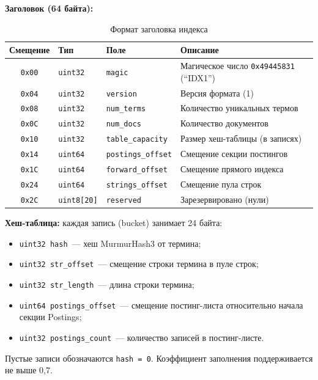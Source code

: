 \documentclass[a4paper,12pt]{article}
\begin{document}
\textbf{Заголовок (64 байта):}

\begin{table}[H]
\centering
\caption{Формат заголовка индекса}
\begin{tabular}{cllp{6cm}}
\toprule
\textbf{Смещение} & \textbf{Тип} & \textbf{Поле} & \textbf{Описание} \\
\midrule
\texttt{0x00} & \texttt{uint32} & \texttt{magic}            & Магическое число \texttt{0x49445831} (``IDX1'') \\
\texttt{0x04} & \texttt{uint32} & \texttt{version}          & Версия формата (1) \\
\texttt{0x08} & \texttt{uint32} & \texttt{num\_terms}       & Количество уникальных термов \\
\texttt{0x0C} & \texttt{uint32} & \texttt{num\_docs}        & Количество документов \\
\texttt{0x10} & \texttt{uint32} & \texttt{table\_capacity}  & Размер хеш-таблицы (в записях) \\
\texttt{0x14} & \texttt{uint64} & \texttt{postings\_offset} & Смещение секции постингов \\
\texttt{0x1C} & \texttt{uint64} & \texttt{forward\_offset}  & Смещение прямого индекса \\
\texttt{0x24} & \texttt{uint64} & \texttt{strings\_offset}  & Смещение пула строк \\
\texttt{0x2C} & \texttt{uint8[20]} & \texttt{reserved}      & Зарезервировано (нули) \\
\bottomrule
\end{tabular}
\end{table}

\textbf{Хеш-таблица:} каждая запись (bucket) занимает 24 байта:
\begin{itemize}
    \item \texttt{uint32 hash}~--- хеш MurmurHash3 от термина;
    \item \texttt{uint32 str\_offset}~--- смещение строки термина в пуле строк;
    \item \texttt{uint32 str\_length}~--- длина строки термина;
    \item \texttt{uint64 postings\_offset}~--- смещение постинг-листа относительно начала секции Postings;
    \item \texttt{uint32 postings\_count}~--- количество записей в постинг-листе.
\end{itemize}
Пустые записи обозначаются \texttt{hash = 0}. Коэффициент заполнения поддерживается не выше 0,7.
\end{document}
